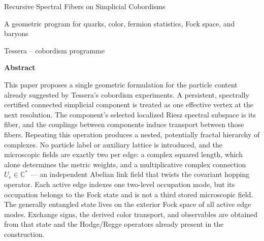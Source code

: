 \documentclass[11pt,letterpaper]{article}
\begin{document}
\hypersetup{pageanchor=false}

\begin{titlepage}
\begin{center}
\vspace*{0.35cm}
{\LARGE Recursive Spectral Fibers on Simplicial Cobordisms\par}
\vspace{0.2cm}
{\large A geometric program for quarks, color, fermion statistics, Fock space, and baryons\par}
\vspace{0.45cm}
{\large Tessera -- cobordism programme\par}
\vspace{0.3cm}
{\bfseries Abstract\par}
\end{center}
\begingroup\footnotesize

\noindent
This paper proposes a single geometric formulation for the particle content
already suggested by Tessera's cobordism experiments. A persistent, spectrally
certified connected simplicial component is treated as one effective vertex at
the next resolution. The component's selected localized Riesz spectral
subspace is its fiber, and the couplings between components induce transport
between those
fibers. Repeating this operation produces a nested, potentially fractal
hierarchy of complexes. No particle label or auxiliary lattice is introduced,
and the microscopic fields are exactly two per edge: a complex squared length,
which alone determines the metric weights, and a multiplicative complex
connection $U_e\in\mathbb{C}^{*}$ --- an independent Abelian link field that
twists the covariant hopping operator. Each active edge indexes one two-level
occupation mode, but its occupation belongs to the Fock state and is not a
third stored microscopic field.
The generally entangled state lives on the exterior Fock space of all active
edge modes. Exchange signs, the derived color transport, and observables are
obtained from that state and the Hodge/Regge operators already present in the
construction.


\end{titlepage}
\end{document}
